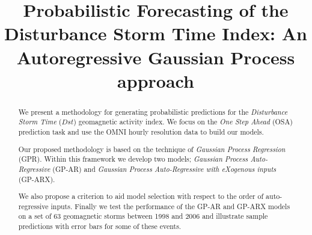 \documentclass[draft,sw]{AGUTeX}
\begin{document}
%
%


\title{Probabilistic Forecasting of the Disturbance Storm Time Index: An Autoregressive Gaussian Process approach}





\begin{abstract}
We present a methodology for generating probabilistic predictions for the \emph{Disturbance Storm Time} ($Dst$) geomagnetic activity index. We focus on the \emph{One Step Ahead} (OSA) prediction task and use the OMNI hourly resolution data to build our models.

Our proposed methodology is based on the technique of \emph{Gaussian Process Regression} (GPR). Within this framework we develop two models; \emph{Gaussian Process Auto-Regressive} (GP-AR) and \emph{Gaussian Process Auto-Regressive with eXogenous inputs} (GP-ARX). 

We also propose a criterion to aid model selection with respect to the order of auto-regressive inputs. Finally we test the performance of the GP-AR and GP-ARX models on a set of 63 geomagnetic storms between 1998 and 2006 and illustrate sample predictions with error bars for some of these events.

\end{abstract}

%
%

%
\end{document}
